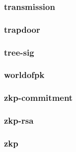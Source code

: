 \begin{frame}\frametitle{transmission}
\begin{figure}
\begin{center}

\end{center}
\end{figure}
\end{frame}
\begin{frame}\frametitle{trapdoor}
\begin{figure}
\begin{center}

\end{center}
\end{figure}
\end{frame}
\begin{frame}\frametitle{tree-sig}
\begin{figure}
\begin{center}

\end{center}
\end{figure}
\end{frame}
\begin{frame}\frametitle{worldofpk}
\begin{figure}
\begin{center}

\end{center}
\end{figure}
\end{frame}
\begin{frame}\frametitle{zkp-commitment}
\begin{figure}
\begin{center}

\end{center}
\end{figure}
\end{frame}
\begin{frame}\frametitle{zkp-rsa}
\begin{figure}
\begin{center}

\end{center}
\end{figure}
\end{frame}
\begin{frame}\frametitle{zkp}
\begin{figure}
\begin{center}

\end{center}
\end{figure}
\end{frame}

